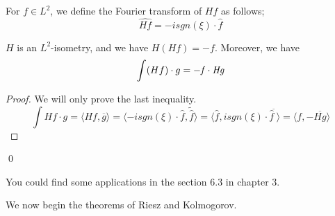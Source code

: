 \begin{definition}
    For $f\in L^2$, we define the Fourier transform of $Hf$ as follows;
    \begin{equation*}
        \widehat{Hf}=-isgn(\xi)\cdot\hat{f}
    \end{equation*}
\end{definition}

\begin{proposition}
    $H$ is an $L^2$-isometry, and we have $H(Hf)=-f$. Moreover, we have
    \begin{equation*}
        \int (Hf)\cdot g=-\it f\cdot Hg
    \end{equation*}
\end{proposition}
\begin{proof}
    We will only prove the last inequality.
    \begin{equation*}
        \int Hf\cdot g=\langle Hf, \overline{g}\rangle=\langle -isgn(\xi)\cdot\hat{f},\tilde{\hat{f}}\rangle =\langle \hat{f}, isgn(\xi)\cdot\hat{f}^{\tilde{\phantom{.}}}\rangle=\langle f, -\overline{Hg}\rangle
    \end{equation*}
\end{proof}
\qed

\begin{remark}
    You could find some applications in the section 6.3 in chapter 3.
\end{remark}

We now begin the theorems of Riesz and Kolmogorov.

